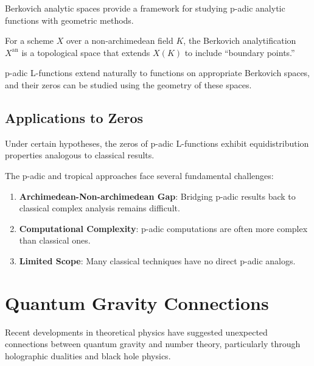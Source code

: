 Berkovich analytic spaces provide a framework for studying p-adic analytic functions with geometric methods.

\begin{definition}
\label{def:berkovich_analytification}
For a scheme $X$ over a non-archimedean field $K$, the Berkovich analytification $X^{\text{an}}$ is a topological space that extends $X(K)$ to include ``boundary points.''
\end{definition}

\begin{theorem}
\label{thm:berkovich_thuillier}
p-adic L-functions extend naturally to functions on appropriate Berkovich spaces, and their zeros can be studied using the geometry of these spaces.
\end{theorem}

\subsection{Applications to Zeros}

\begin{proposition}
\label{prop:padic_zero_distribution}
Under certain hypotheses, the zeros of p-adic L-functions exhibit equidistribution properties analogous to classical results.
\end{proposition}

The p-adic and tropical approaches face several fundamental challenges:

\begin{enumerate}
\item \textbf{Archimedean-Non-archimedean Gap}: Bridging p-adic results back to classical complex analysis remains difficult.

\item \textbf{Computational Complexity}: p-adic computations are often more complex than classical ones.

\item \textbf{Limited Scope}: Many classical techniques have no direct p-adic analogs.
\end{enumerate}

\section{Quantum Gravity Connections}
\label{sec:quantum_gravity}

Recent developments in theoretical physics have suggested unexpected connections between quantum gravity and number theory, particularly through holographic dualities and black hole physics.


